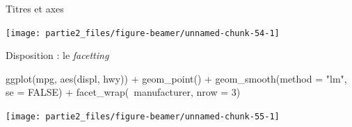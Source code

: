 \documentclass[12pt,ignorenonframetext,]{beamer}
\newenvironment{Shaded}{}{}
\newcommand{\CharTok}[1]{\textcolor[rgb]{0.00,0.50,0.50}{#1}}
\newcommand{\DataTypeTok}[1]{#1}
\newcommand{\DecValTok}[1]{#1}
\newcommand{\KeywordTok}[1]{\textcolor[rgb]{0.00,0.00,1.00}{#1}}
\newcommand{\NormalTok}[1]{#1}
\newcommand{\OperatorTok}[1]{#1}
\newcommand{\OtherTok}[1]{\textcolor[rgb]{1.00,0.25,0.00}{#1}}
\newcommand{\StringTok}[1]{\textcolor[rgb]{0.00,0.50,0.50}{#1}}
\renewenvironment{Shaded}{\begin{snugshade}}{\end{snugshade}}
\begin{document}
\begin{frame}[fragile]{Titres et axes}
\protect\hypertarget{titres-et-axes}{}

\footnotesize \center

\begin{Shaded}
\end{Shaded}

\texttt{[image: partie2\_files/figure-beamer/unnamed-chunk-54-1]}

\end{frame}

\begin{frame}[fragile]{Disposition : le \emph{facetting}}
\protect\hypertarget{disposition-le-facetting}{}

\footnotesize \center

\begin{Shaded}
\begin{Highlighting}[]
\KeywordTok{ggplot}\NormalTok{(mpg, }\KeywordTok{aes}\NormalTok{(displ, hwy)) }\OperatorTok{+}
\StringTok{  }\KeywordTok{geom_point}\NormalTok{() }\OperatorTok{+}\StringTok{ }\KeywordTok{geom_smooth}\NormalTok{(}\DataTypeTok{method =} \StringTok{"lm"}\NormalTok{, }\DataTypeTok{se =} \OtherTok{FALSE}\NormalTok{) }\OperatorTok{+}\StringTok{ }
\StringTok{  }\KeywordTok{facet_wrap}\NormalTok{(}\OperatorTok{~}\NormalTok{manufacturer, }\DataTypeTok{nrow =} \DecValTok{3}\NormalTok{)}
\end{Highlighting}
\end{Shaded}

\texttt{[image: partie2\_files/figure-beamer/unnamed-chunk-55-1]}

\end{frame}
\end{document}
